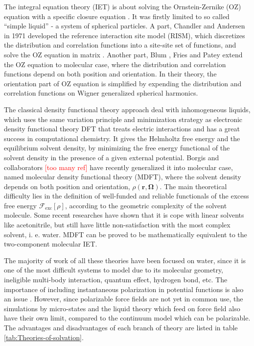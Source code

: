 The integral equation theory (\acs{IET}) is about solving the Ornstein-Zernike
(\acs{OZ}) equation with a specific closure equation \citep{Hensen-McDonald,Gray-Gubbins}.
It was firstly limited to so called ``simple liquid'' - a system
of spherical particles. A part, Chandler and Andersen in 1971 \citep{Chandler_1972_RISM}
developed the reference interaction site model (\acs{RISM}), which
discretizes the distribution and correlation functions into a site-site
set of functions, and solve the \acs{OZ} equation in matrix \citep{hirata_molecular_2004}.
Another part, Blum \citep{Blum_I,Blum_II}, Fries and Patey \citep{Fries_Patey_1985}
extend the \acs{OZ} equation to molecular case, where the distribution
and correlation functions depend on both position and orientation.
In their theory, the orientation part of \acs{OZ} equation is simplified
by expending the distribution and correlation functions on Wigner
generalized spherical harmonics.

The classical density functional theory approach deal with inhomogeneous
liquids, which uses the same variation principle and minimization
strategy \citep{mermin_thermal_1965,Evans_1979,Hansen_1987} as electronic
density functional theory \acs{DFT} that treats electric interactions
and has a great success in computational chemistry. It gives the Helmholtz
free energy and the equilibrium solvent density, by minimizing the
free energy functional of the solvent density in the presence of a
given external potential. Borgis and collaborators \textcolor{red}{{[}too
many ref{]}} have recently generalized it into molecular case, named
molecular density functional theory (\acs{MDFT}), where the solvent
density depends on both position and orientation, $\rho(\mathbf{r},\mathbf{\Omega})$.
The main theoretical difficulty lies in the definition of well-funded
and reliable functionals of the excess free energy $\mathcal{F}_{\mathrm{exc}}\left[\rho\right]$,
according to the geometric complexity of the solvent molecule. Some
recent researches have shown that it is cope with linear solvents
like acetonitrile, but still have little non-satisfaction with the
most complex solvent, i. e. water. \acs{MDFT} can be proved to be
mathematically equivalent to the two-component molecular \acs{IET}.

The majority of work of all these theories have been focused on water,
since it is one of the most difficult systems to model due to its
molecular geometry, ineligible multi-body interaction, quantum effect,
hydrogen bond, etc. The importance of including instantaneous polarization
in potential functions is also an issue \citep{polarisable_1,polarisable_2}.
However, since polarizable force fields are not yet in common use,
the simulations by micro-states and the liquid theory which feed on
force field also have their own limit, compared to the continuum model
which can be polarizable. The advantages and disadvantages of each
branch of theory are listed in table \ref{tab:Theories-of-solvation}.

